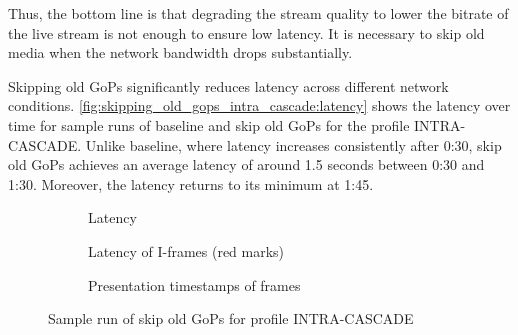 
Thus, the bottom line is that degrading the stream quality to lower the bitrate of the live stream is not enough to ensure low latency. %
It is necessary to skip old media when the network bandwidth drops substantially.

Skipping old GoPs significantly reduces latency across different network conditions. \autoref{fig:skipping_old_gops_intra_cascade:latency} shows the latency over time for sample runs of baseline and skip old GoPs for the profile INTRA-CASCADE. Unlike baseline, where latency increases consistently after 0:30, skip old GoPs achieves an average latency of around 1.5 seconds between 0:30 and 1:30. Moreover, the latency returns to its minimum at 1:45.

\begin{figure}
    \centering
    \begin{subfigure}{\textwidth}
        \centering
        
        \vspace{0.8em}
        \caption{Latency}
        \label{fig:skipping_old_gops_intra_cascade:latency}
    \end{subfigure}

    \vspace{2em}

    \begin{subfigure}{0.45\textwidth}
        \centering
        
        \caption{Latency of I-frames (red marks)}
        \label{fig:skipping_old_gops_intra_cascade:latency_with_i_frames}
    \end{subfigure}
    \begin{subfigure}{0.45\textwidth}
        \centering
        
        \caption{Presentation timestamps of frames}
        \label{fig:skipping_old_gops_intra_cascade:pts_received}
    \end{subfigure}

    \vspace{1.5em}

    \caption{Sample run of skip old GoPs for profile INTRA-CASCADE}
\end{figure}

